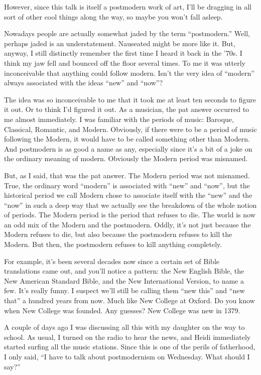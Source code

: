 \documentclass[10pt,letterpaper]{article}
\begin{document}
However, since this talk is itself a postmodern work of art, I'll be dragging
in all sort of other cool things along the way, so maybe you won't fall
asleep.

Nowadays people are actually somewhat jaded by the term ``postmodern.''
Well, perhaps jaded is an understatement. Nauseated might be more like it.
But, anyway, I still distinctly remember the first time I heard it back in
the '70s. I think my jaw fell and bounced off the floor several times. To me
it was utterly inconceivable that anything could follow modern. Isn't the
very idea of ``modern'' always associated with the ideas ``new'' and
``now''?

The idea was so inconceivable to me that it took me at least ten seconds to
figure it out. Or to think I'd figured it out. As a musician, the pat answer
occurred to me almost immediately. I was familiar with the periods of music:
Baroque, Classical, Romantic, and Modern. Obviously, if there were to be a
period of music following the Modern, it would have to be called something
other than Modern. And postmodern is as good a name as any, especially since
it's a bit of a joke on the ordinary meaning of modern. Obviously the Modern
period was misnamed.

But, as I said, that was the pat answer. The Modern period was not misnamed.
True, the ordinary word ``modern'' is associated with ``new'' and
``now'', but the historical period we call Modern chose to associate itself
with the ``new'' and the ``now'' in such a deep way that we actually see
the breakdown of the whole notion of periods. The Modern period is the period
that refuses to die. The world is now an odd mix of the Modern and the
postmodern. Oddly, it's not just because the Modern refuses to die, but also
because the postmodern refuses to kill the Modern. But then, the postmodern
refuses to kill anything completely.

For example, it's been several decades now since a certain set of Bible
translations came out, and you'll notice a pattern: the New English Bible,
the New American Standard Bible, and the New International Version, to name a
few. It's really funny. I suspect we'll still be calling them ``new this''
and ``new that'' a hundred years from now. Much like New College at Oxford.
Do you know when New College was founded. Any guesses? New College was new in
1379.

A couple of days ago I was discussing all this with my daughter on the way to
school. As usual, I turned on the radio to hear the news, and Heidi
immediately started surfing all the music stations. Since this is one of the
perils of fatherhood, I only said, ``I have to talk about postmodernism on
Wednesday. What should I say?''
\end{document}
